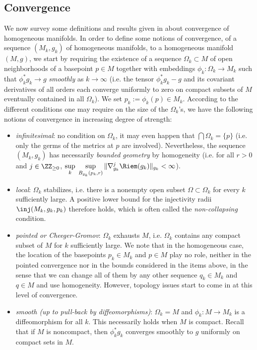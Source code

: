 \documentclass[11pt]{amsart}
\theoremstyle{plain}
\theoremstyle{definition}
\theoremstyle{remark}
\begin{document}
\subsection{Convergence}\label{convergence}
We now survey some definitions and results given in \cite{spacehm} about convergence of homogeneous manifolds. In order to define some notions of convergence, of a sequence $(M_k,g_k)$ of homogeneous manifolds, to a homogeneous manifold $(M,g)$, we start by requiring the existence of a sequence $\Omega_k\subset M$ of open neighborhoods of a basepoint $p\in M$ together with embeddings $\phi_k:\Omega_k\longrightarrow M_k$ such that $\phi_k^*g_k\to g$ {\it smoothly} as $k\to\infty$ (i.e. the tensor $\phi_k^*g_k-g$ and its covariant derivatives of all orders each converge uniformly to zero on compact subsets of $M$ eventually contained in all $\Omega_k$).  We set $p_k:=\phi_k(p)\in M_k$.  According to the different conditions one may require on the size of the $\Omega_k$'s, we have the following notions of convergence in increasing degree of strength:

\begin{itemize}
\item {\it infinitesimal}: no condition on $\Omega_k$, it may even happen that $\bigcap\Omega_k=\{ p\}$ (i.e. only the germs of the metrics at $p$ are involved).  Nevertheless, the sequence $(M_k,g_k)$ has necessarily {\it bounded geometry} by homogeneity (i.e. for all $r>0$ and $j\in\ZZ_{\geq 0}$,
$\sup\limits_k\;\sup\limits_{B_{g_k}(p_k,r)} \|\nabla_{g_k}^j\Riem(g_k)\|_{g_k}<\infty$).

\item {\it local}: $\Omega_k$ stabilizes, i.e. there is a nonempty open subset $\Omega\subset\Omega_k$ for every $k$ sufficiently large.  A positive lower bound for the injectivity radii $\inj(M_k,g_k,p_k)$ therefore holds, which is often called the {\it non-collapsing} condition.

\item {\it pointed or Cheeger-Gromov}: $\Omega_k$ exhausts $M$, i.e. $\Omega_k$ contains any compact subset of $M$ for $k$ sufficiently large.  We note that in the homogeneous case, the location of the basepoints $p_k\in M_k$ and $p\in M$ play no role, neither in the pointed convergence nor in the bounds considered in the items above, in the sense that we can change all of them by any other sequence $q_k\in M_k$ and $q\in M$ and use homogeneity.  However, topology issues start to come in at this level of convergence.

\item {\it smooth (up to pull-back by diffeomorphisms)}: $\Omega_k=M$ and $\phi_k:M\longrightarrow M_k$ is a diffeomorphism for all $k$.  This necessarily holds when $M$ is compact.  Recall that if $M$ is noncompact, then $\phi_k^*g_k$ converges smoothly to $g$ uniformly on compact sets in $M$.
\end{itemize}
\end{document}
